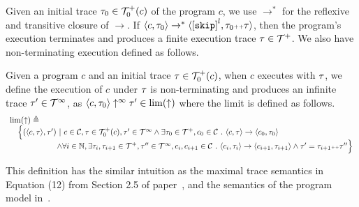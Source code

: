 Given an initial trace $\mathtt{\tau}_0 \in \mathcal{T}^{+}_0(c)$ of the program $c$,
we use $\to^*$ for the reflexive and transitive closure of $\to$. 
If $\config{c, \trace_0} \rightarrow^{*} \config{\clabel{\eskip}^l, \trace_0 \tracecat \trace}$,
then the program's execution terminates and produces a finite execution trace $\mathtt{\tau} \in \mathcal{T}^{+}$. We also have non-terminating execution defined as follows.
\\
\begin{defn}
  \label{def:non-terminating}
  Given a program $c$ and an initial trace $\mathtt{\tau} \in \mathcal{T}^{+}_0(c)$,
  when $c$ executes with $\mathtt{\tau}$,  we define the execution of $c$ under $\mathtt{\tau}$ is non-terminating and produces an infinite trace $\mathtt{\tau}' \in \mathcal{T}^{\infty}$, as 
  $\langle c, \mathtt{\tau}_0 \rangle \uparrow^{\infty} \mathtt{\tau}' \in \lim(\uparrow)$
  where the limit is defined as follows.
  \[
    \begin{array}{l}
      \lim(\uparrow) 
      \triangleq 
    \\ \quad
    \Big\{
      (\langle c, \mathtt{\tau} \rangle, \mathtt{\tau}') ~\vert~ 
      c\in \mathcal{C}, \mathtt{\tau} \in \mathcal{T}^{+}_0(c),
      \mathtt{\tau}' \in \mathcal{T}^{\infty} 
      \land \exists \mathtt{\tau}_0 \in \mathcal{T}^{+}, c_0 \in \mathcal{C} ~.~ 
      \langle c, \mathtt{\tau} \rangle \to \langle c_0, \mathtt{\tau}_0 \rangle
      \\ \qquad \qquad \qquad 
      \land \forall i \in \mathbb{N}, \exists \mathtt{\tau}_i, \mathtt{\tau}_{i + 1} \in \mathcal{T}^{+}, \mathtt{\tau}'' \in \mathcal{T}^{\infty}, c_i, c_{i + 1} \in \mathcal{C} ~.~ 
      \langle c_i, \mathtt{\tau}_i \rangle \to \langle c_{i + 1}, \mathtt{\tau}_{i + 1} \rangle 
      \land  \mathtt{\tau}' = \mathtt{\tau}_{i + 1} {\scriptscriptstyle ++} \mathtt{\tau}''
    \Big\}
    \end{array}
  \]
\end{defn}
This definition has the similar intuition as the maximal trace semantics in Equation (12) from Section 2.5 of paper~\cite{Cousot19a}, and the semantics of the program model in~\cite{SinnZV17}.


